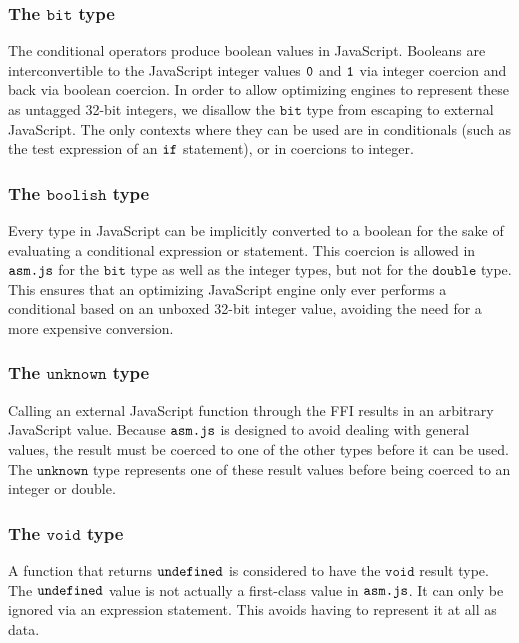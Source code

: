 \documentclass{article}
\newcommand{\mathjs}[1]{\mbox{\texttt{{#1}}}}
\newcommand{\bit}{\mathtt{bit}}
\newcommand{\double}{\mathtt{double}}
\newcommand{\unk}{\mathtt{unknown}}
\newcommand{\void}{\mathtt{void}}
\newcommand{\boolish}{\mathtt{boolish}}
\begin{document}
\subsubsection*{The $\bit$ type}

The conditional operators produce boolean values in
JavaScript. Booleans are interconvertible to the JavaScript integer
values $\mathjs{0}$ and $\mathjs{1}$ via integer coercion and back via
boolean coercion. In order to allow optimizing engines to represent
these as untagged 32-bit integers, we disallow the $\bit$ type from
escaping to external JavaScript. The only contexts where they can be
used are in conditionals (such as the test expression of an
$\mathjs{if}$ statement), or in coercions to integer.

\subsubsection*{The $\boolish$ type}

Every type in JavaScript can be implicitly converted to a boolean for
the sake of evaluating a conditional expression or statement. This
coercion is allowed in $\mathjs{asm.js}$ for the $\bit$ type as well
as the integer types, but not for the $\double$ type. This ensures
that an optimizing JavaScript engine only ever performs a conditional
based on an unboxed 32-bit integer value, avoiding the need for a more
expensive conversion.

\subsubsection*{The $\unk$ type}

Calling an external JavaScript function through the FFI results in an
arbitrary JavaScript value. Because $\mathjs{asm.js}$ is designed to
avoid dealing with general values, the result must be coerced to one
of the other types before it can be used. The $\unk$ type represents
one of these result values before being coerced to an integer or
double.

\subsubsection*{The $\void$ type}

A function that returns $\mathjs{undefined}$ is considered to have the
$\void$ result type. The $\mathjs{undefined}$ value is not actually a
first-class value in $\mathjs{asm.js}$. It can only be ignored via an
expression statement. This avoids having to represent it at all as
data.
\end{document}
